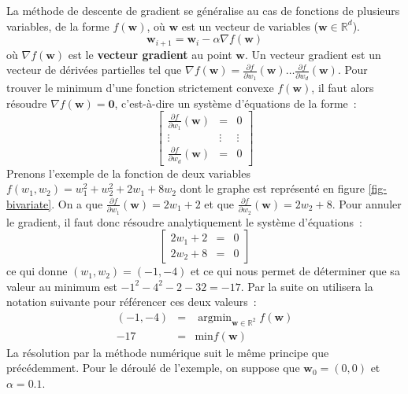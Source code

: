 \documentclass[11pt,openany]{book}
\newcommand{\kw}[1]{{\bf #1}} %
\begin{document}
La méthode de descente de gradient se généralise au cas de fonctions de plusieurs variables, 
de la forme $f(\mathbf{w})$, où $\mathbf{w}$ est un vecteur de
variables ($\mathbf{w}\in \mathbb{R}^d$).
\begin{displaymath}
\mathbf{w}_{i+1} = \mathbf{w}_i - \alpha   \nabla f(\mathbf{w})
\end{displaymath}
où $\nabla f(\mathbf{w})$ est le \kw{vecteur gradient} au point $\mathbf{w}$. 
Un vecteur gradient est un vecteur de dérivées
partielles tel que $\nabla f(\mathbf{w}) = \frac{\partial f}{\partial
  w_1}(\mathbf{w}) \ldots \frac{\partial f}{\partial w_d}(\mathbf{w})$. 
Pour trouver le minimum d'une fonction strictement convexe $f(\mathbf{w})$, il faut alors
résoudre $\nabla f(\mathbf{w})= \mathbf{0}$, c'est-à-dire un système
d'équations de la forme~:
\begin{displaymath}
\left[\begin{array}{lll}
 \frac{\partial f}{\partial
  w_1}(\mathbf{w})&=&0\\
\vdots&\vdots&\vdots\\
 \frac{\partial f}{\partial
  w_d}(\mathbf{w})&=&0
\end{array}\right]
\end{displaymath}
Prenons l'exemple de la fonction de deux variables $f(w_1,w_2) =
w_1^2+w_2^2+2w_1+8w_2$ dont le graphe est représenté en figure \ref{fig-bivariate}.
On a que  $\frac{\partial f}{\partial w_1}(\mathbf{w}) = 2w_1+2$ et que  $\frac{\partial f}{\partial
  w_2}(\mathbf{w}) = 2w_2+ 8$. Pour annuler le gradient, il faut donc résoudre
analytiquement
le système d'équations~:
\begin{displaymath}
\left[\begin{array}{lll}
2w_1+ 2&=&0\\
2w_2+ 8&=&0
\end{array}\right]
\end{displaymath}
ce qui donne $(w_1,w_2) = (-1,-4)$ et ce qui nous permet de déterminer
que sa valeur au minimum est $-1^2-4^2-2-32 =-17$. 
Par la suite on utilisera la notation suivante pour référencer ces deux valeurs~:
\begin{eqnarray*}
(-1,-4)&=&\mathop{\text{argmin}}_{\mathbf{w}\in\mathbb{R}^2} f(\mathbf{w})\\
-17 &=&\text{min} f(\mathbf{w})
\end{eqnarray*}
La résolution par la méthode
numérique suit le même principe que précédemment. Pour le déroulé de
l'exemple, on suppose que
$\mathbf{w}_0=(0,0)$ et $\alpha=0.1$.
\end{document}

